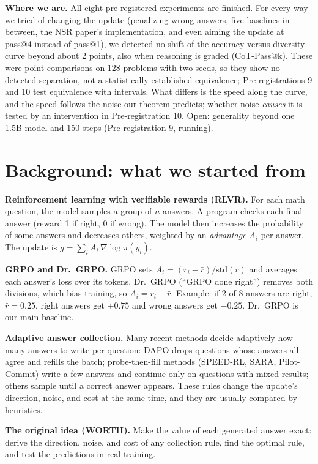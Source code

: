 \documentclass[11pt]{article}
\begin{document}
\textbf{Where we are.} All eight pre-registered experiments are finished. For every way we tried of changing the update (penalizing wrong answers, five baselines in between, the NSR paper's implementation, and even aiming the update at pass@4 instead of pass@1), we detected no shift of the accuracy-versus-diversity curve beyond about 2 points, also when reasoning is graded (CoT-Pass@k). These were point comparisons on 128 problems with two seeds, so they show no detected separation, not a statistically established equivalence; Pre-registrations 9 and 10 test equivalence with intervals. What differs is the speed along the curve, and the speed follows the noise our theorem predicts; whether noise \emph{causes} it is tested by an intervention in Pre-registration 10. Open: generality beyond one 1.5B model and 150 steps (Pre-registration 9, running).

\tableofcontents
\newpage

\section{Background: what we started from}

\textbf{Reinforcement learning with verifiable rewards (RLVR).} For each math question, the model samples a group of $n$ answers. A program checks each final answer (reward 1 if right, 0 if wrong). The model then increases the probability of some answers and decreases others, weighted by an \emph{advantage} $A_i$ per answer. The update is $g=\sum_i A_i\,\nabla\log\pi(y_i)$.

\textbf{GRPO and Dr.\ GRPO.} GRPO sets $A_i=(r_i-\bar r)/\mathrm{std}(r)$ and averages each answer's loss over its tokens. Dr.\ GRPO (``GRPO done right'') removes both divisions, which bias training, so $A_i=r_i-\bar r$. Example: if 2 of 8 answers are right, $\bar r=0.25$, right answers get $+0.75$ and wrong answers get $-0.25$. Dr.\ GRPO is our main baseline.

\textbf{Adaptive answer collection.} Many recent methods decide adaptively how many answers to write per question: DAPO drops questions whose answers all agree and refills the batch; probe-then-fill methods (SPEED-RL, SARA, Pilot-Commit) write a few answers and continue only on questions with mixed results; others sample until a correct answer appears. These rules change the update's direction, noise, and cost at the same time, and they are usually compared by heuristics.

\textbf{The original idea (WORTH).} Make the value of each generated answer exact: derive the direction, noise, and cost of any collection rule, find the optimal rule, and test the predictions in real training.
\end{document}
